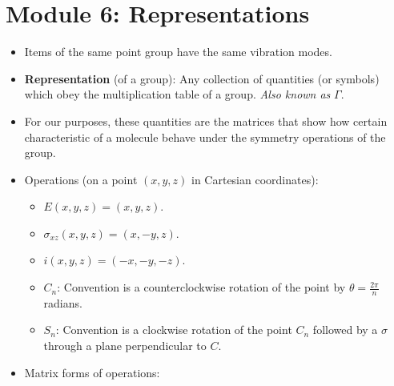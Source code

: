 \documentclass[../notes.tex]{subfiles}
\begin{document}
\section{Module 6: Representations}
\begin{itemize}
    \item Items of the same point group have the same vibration modes.
    \item \textbf{Representation} (of a group): Any collection of quantities (or symbols) which obey the multiplication table of a group. \emph{Also known as} $\Gamma$.
    \item For our purposes, these quantities are the matrices that show how certain characteristic of a molecule behave under the symmetry operations of the group.
    \item Operations (on a point $(x,y,z)$ in Cartesian coordinates):
    \begin{itemize}
        \item $E(x,y,z)=(x,y,z)$.
        \item $\sigma_{xz}(x,y,z)=(x,-y,z)$.
        \item $i(x,y,z)=(-x,-y,-z)$.
        \item $C_n$: Convention is a counterclockwise rotation of the point by $\theta=\frac{2\pi}{n}$ radians.
        \item $S_n$: Convention is a clockwise rotation of the point $C_n$ followed by a $\sigma$ through a plane perpendicular to $C$.
    \end{itemize}
    \item Matrix forms of operations:
\end{itemize}
\end{document}
